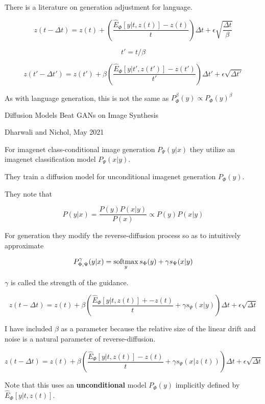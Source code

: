 {\vfill
There is a literature on generation adjustment for language.


{\huge

$$z(t - \Delta t) = z(t) + \left(\frac{\hat{E}_\Phi[y|t,z(t)] - z(t)}{t}\right)\Delta t + \epsilon\sqrt{\frac{\Delta t}{\beta}}$$


\vfill
$$t' = t/\beta$$

\vfill
$$z(t' - \Delta t') = z(t') + \beta\left(\frac{\hat{E}_\Phi[y|t',z(t')] - z(t')}{t'}\right)\Delta t' + \epsilon\sqrt{\Delta t'}$$

\vfill
As with language generation, this is not the same as $P^\beta_\Phi(y) \propto P_\Phi(y)^\beta$
}


\centerline{Diffusion Models Beat GANs on Image Synthesis}
\centerline{Dharwali and Nichol, May 2021}

\vfill
For imagenet class-conditional image generation $P_\Psi(y|x)$ they utilize an imagenet classification model $P_\Psi(x|y)$.

\vfill
They train a diffusion model for unconditional imagenet generation $P_\Phi(y)$.

\vfill
They note that

$$P(y|x) = \frac{P(y)P(x|y)}{P(x)} \propto P(y)P(x|y)$$


For generation they modify the reverse-diffusion process so as to intuitively approximate

\vfill
$$P^\gamma_{\Phi,\Psi}(y|x) = \operatorname*{softmax}_y s_\Phi(y)+ \gamma s_\Psi(x|y)$$

\vfill
$\gamma$ is called the strength of the guidance.

\vfill
{\huge $$z(t - \Delta t) = z(t) + \beta\left(\frac{\hat{E}_\Phi[y|t,z(t)] + - z(t)}{t} + \gamma s_\Psi(x|y)\right)\Delta t + \epsilon\sqrt{\Delta t}$$}

\vfill
I have included $\beta$ as a parameter because the relative size of the linear drift and noise is a natural parameter of reverse-diffusion.



\vfill
$$z(t - \Delta t) = z(t) + \beta\left(\frac{\hat{E}_\Phi[y|t,z(t)] - z(t)}{t} + \gamma s_\Psi(x|z(t))\right)\Delta t + \epsilon\sqrt{\Delta t}$$

\vfill
Note that this uses an {\bf unconditional} model $P_\Phi(y)$ implicitly defined by $\hat{E}_\Phi[y|t,z(t)]$.

}
